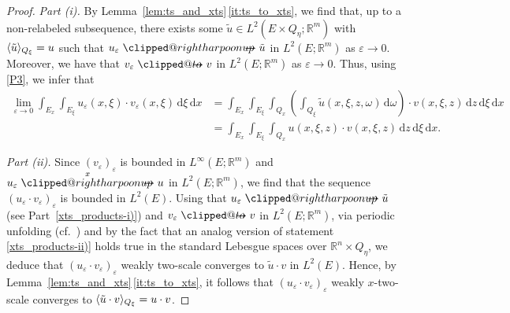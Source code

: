 \documentclass[reqno,11pt]{amsart}
\makeatletter
\numberwithin{equation}{section}
\theoremstyle{thmlemcorr}
\numberwithin{theorem}{section}
\theoremstyle{thmlemcorr*}
\theoremstyle{defi}
\theoremstyle{remexample}
\theoremstyle{ass}
\newcommand{\R}{\mathbb{R}}
\renewcommand{\epsilon}{\varepsilon}
\DeclarePairedDelimiter{\inner}{\langle}{\rangle}
\newcommand{\1}{\mathds{1}}
\DeclareRobustCommand{\wtwoscale}{%
  \clippedrightharpoonup\mathrel{\mspace{-15mu}}\rightharpoonup
}
\newcommand{\clippedrightharpoonup}{%
  \mathrel{\mathpalette\clipped@rightharpoonup\relax}%
}
\newcommand{\clipped@rightharpoonup}[2]{%
  \sbox\z@{$\m@th#1\mspace{6mu}$}%
  \clipbox{0pt 0pt {\dimexpr\width-.5\wd\z@} 0pt}{$\m@th#1\rightharpoonup$}%
  \smash{\clipbox{{\wd\z@} 0pt 0pt {-\width}}{$\m@th#1\rightharpoonup$}}%
}
\DeclareRobustCommand{\twoscale}{%
  \clippedto\mathrel{\mspace{-15mu}}\to
}
\newcommand{\clippedto}{%
  \mathrel{\mathpalette\clipped@to\relax}%
}
\newcommand{\clipped@to}[2]{%
  \sbox\z@{$\m@th#1\mspace{6mu}$}%
  \clipbox{0pt 0pt {\dimexpr\width-.5\wd\z@} 0pt}{$\m@th#1\to$}%
  \smash{\clipbox{{\wd\z@} 0pt 0pt {-\width}}{$\m@th#1\to$}}%
}
\newcommand{\wxtwoscale}{\overset{x}{\wtwoscale}}
\newcommand{\veps}{\varepsilon}
\newcommand{\dl}{\,\mathrm{d}}
\newcommand{\comment}[1]{{\textcolor{red}{$\langle\hspace{-0.3ex}\langle$Leon: #1$\rangle\hspace{-0.3ex}\rangle$}}}
\newcommand{\ROSS}[1]{{\textcolor{blue}{$\langle\hspace{-0.3ex}\langle$Ross: #1$\rangle\hspace{-0.3ex}\rangle$}}}
\newcommand{\hidde}[1]{{\textcolor{orange}{$\langle\hspace{-0.3ex}\langle$Hidde: #1$\rangle\hspace{-0.3ex}\rangle$}}}
\makeatother
\begin{document}
\begin{proof}
\textit{Part (i).}
By Lemma~\ref{lem:ts_and_xts}\,\ref{it:ts_to_xts}, we find that, up to a non-relabeled subsequence, there exists some $\tilde{u} \in L^2(E\times Q_\eta;\R^m)$ with $\inner{\tilde{u}}_{Q_\xi}=u$ such that %
$u_\veps \wtwoscale \tilde{u}$ in $L^2(E; \R^m)$ as $ \veps \to 0$.
Moreover, we have that $v_\veps \twoscale v$ in $L^2(E; \R^m)$ as $\veps\to 0.$ %
Thus, using \ref{P3}, we infer that
\begin{align*}
    \lim_{\epsilon \to 0} \int_{E_x}\int_{E_\xi} u_\veps(x,\xi) \cdot v_\veps(x,\xi)\dl \xi\dl x
         &=\int_{E_x}\int_{E_\xi}\int_{Q_x} \left( \int_{Q_\xi}\tilde{u}(x,\xi,z,\omega) \dl \omega \right)\cdot v(x,\xi,z)\dl z\dl \xi\dl x\\
         &=\int_{E_x}\int_{E_\xi}\int_{Q_x} u(x,\xi,z)\cdot v(x,\xi,z)\dl z\dl \xi\dl x.  
\end{align*}
\smallskip

\textit{Part (ii).} 
Since $(v_\epsilon)_\epsilon$ is bounded in $L^{\infty}(E;\R^m)$ and $u_\veps \wxtwoscale u$ in $L^2(E; \R^m)$, we find that the sequence $(u_\epsilon \cdot v_\epsilon)_\epsilon$ is bounded in $L^2(E)$. Using that $u_\epsilon \wtwoscale \tilde{u}$ (see Part~\ref{xts_products-i)}) and $v_\epsilon \twoscale v$ in $L^2(E; \R^m)$, via periodic unfolding (cf.\ \cite{Vi06}) and by the fact that an analog version of statement \ref{xts_products-ii)} holds true in the standard Lebesgue spaces over \(\R^n\times Q_\eta\), we deduce
that $(u_\epsilon \cdot v_\epsilon)_\epsilon$ weakly two-scale converges to $\tilde{u} \cdot v$ in $L^2(E)$. Hence, by Lemma~\ref{lem:ts_and_xts}\,\ref{it:ts_to_xts}, it follows that $(u_\epsilon \cdot v_\epsilon)_\epsilon$ weakly $x$-two-scale converges to $\inner{\tilde{u}\cdot v}_{Q_\xi}=u \cdot v$.\smallskip



\end{proof}
\end{document}
